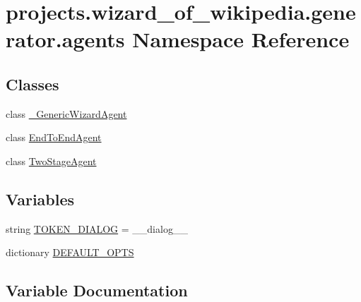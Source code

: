 \hypertarget{namespaceprojects_1_1wizard__of__wikipedia_1_1generator_1_1agents}{}\section{projects.\+wizard\+\_\+of\+\_\+wikipedia.\+generator.\+agents Namespace Reference}
\label{namespaceprojects_1_1wizard__of__wikipedia_1_1generator_1_1agents}
\subsection*{Classes}
\begin{DoxyCompactItemize}
\item 
class \hyperlink{classprojects_1_1wizard__of__wikipedia_1_1generator_1_1agents_1_1__GenericWizardAgent}{\+\_\+\+Generic\+Wizard\+Agent}
\item 
class \hyperlink{classprojects_1_1wizard__of__wikipedia_1_1generator_1_1agents_1_1EndToEndAgent}{End\+To\+End\+Agent}
\item 
class \hyperlink{classprojects_1_1wizard__of__wikipedia_1_1generator_1_1agents_1_1TwoStageAgent}{Two\+Stage\+Agent}
\end{DoxyCompactItemize}
\subsection*{Variables}
\begin{DoxyCompactItemize}
\item 
string \hyperlink{namespaceprojects_1_1wizard__of__wikipedia_1_1generator_1_1agents_a52f7b89b75c258efe22e8add9c970b75}{T\+O\+K\+E\+N\+\_\+\+D\+I\+A\+L\+OG} = \textquotesingle{}\+\_\+\+\_\+dialog\+\_\+\+\_\+\textquotesingle{}
\item 
dictionary \hyperlink{namespaceprojects_1_1wizard__of__wikipedia_1_1generator_1_1agents_ace2f746e6184c16109328b6aaf54308a}{D\+E\+F\+A\+U\+L\+T\+\_\+\+O\+P\+TS}
\end{DoxyCompactItemize}


\subsection{Variable Documentation}
\mbox{\label{namespaceprojects_1_1wizard__of__wikipedia_1_1generator_1_1agents_ace2f746e6184c16109328b6aaf54308a}} 
